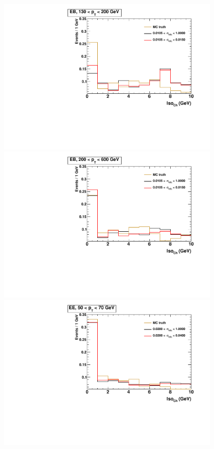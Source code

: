 \begin{figure}[!htbp]
\begin{multicols}{2}
		\includegraphics[scale=0.29]{figures/closure_test_fake_template_chIso_EB_pt130To200_sample_all.pdf} \\
		\includegraphics[scale=0.29]{figures/closure_test_fake_template_chIso_EB_pt200To600_sample_all.pdf} \\
		\includegraphics[scale=0.29]{figures/closure_test_fake_template_chIso_EE_pt50To70_sample_all.pdf} \\

\end{multicols}
\end{figure}
